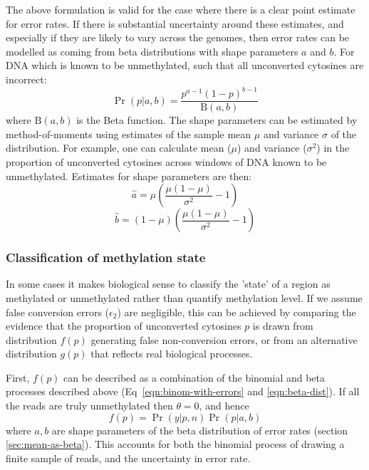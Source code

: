 \documentclass[10pt,letterpaper]{article}
\begin{document}
The above formulation is valid for the case where there is a clear point estimate for error rates.
If there is substantial uncertainty around these estimates, and especially if they are likely to vary across the genomes, then error rates can be modelled as coming from beta distributions with shape parameters $a$ and $b$. For DNA which is known to be unmethylated, such that all unconverted cytosines are incorrect:
\begin{equation}
    \label{eqn:beta-dist}
    \Pr(p|a,b) = \frac{p^{a-1} (1-p)^{b-1}}{\textrm{B}(a,b)}
\end{equation}
where $\textrm{B}(a,b)$ is the Beta function.
The shape parameters can be estimated by method-of-moments using estimates of the sample mean $\mu$ and variance $\sigma$ of the distribution.
For example, one can calculate mean ($\mu$) and variance ($\sigma^2$) in the proportion of unconverted cytosines across windows of DNA known to be unmethylated.
Estimates for shape parameters are then:
\begin{equation}
    \hat{a} = \mu(\frac{\mu(1-\mu)}{\sigma^2}-1)
    \label{eqn:beta-a}
\end{equation}
\begin{equation}
    \hat{b} = (1-\mu)(\frac{\mu(1-\mu)}{\sigma^2}-1) 
    \label{eqn:beta-b}
\end{equation}

\subsubsection*{Classification of methylation state} \label{sec:meth-state}

In some cases it makes biological sense to classify the 'state' of a region as methylated or unmethylated rather than quantify methylation level.
If we assume false conversion errors ($\epsilon_2$) are negligible, this can be achieved by comparing the evidence that the proportion of unconverted cytosines $p$ is drawn from distribution $f(p)$ generating false non-conversion errors, or from an alternative distribution $g(p)$ that reflects real biological processes.

First, $f(p)$ can be described as a combination of the binomial and beta processes described above (Eq~\ref{eqn:binom-with-errors} and \ref{eqn:beta-dist}).
If all the reads are truly unmethylated then $\theta=0$, and hence
\begin{equation}
    f(p) = \Pr(y | p, n) \Pr(p | a, b)
    \label{eqn:f-of-p}
\end{equation}
where $a, b$ are shape parameters of the beta distribution of error rates (section \ref{sec:mean-as-beta}).
This accounts for both the binomial process of drawing a finite sample of reads, and the uncertainty in error rate.
\end{document}
